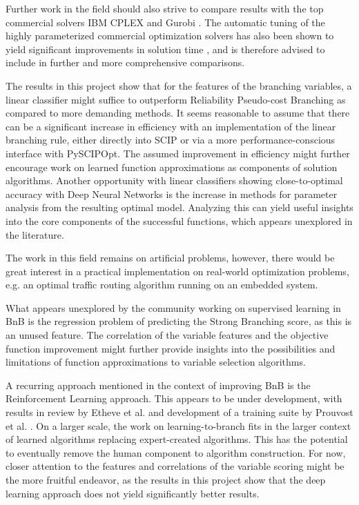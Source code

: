 Further work in the field should also strive to compare results with the top commercial solvers IBM CPLEX and Gurobi \cite{anand2017comparative}. The automatic tuning of the highly parameterized commercial optimization solvers has also been shown to yield significant improvements in solution time \cite{hutter2010automated}, and is therefore advised to include in further and more comprehensive comparisons.  

The results in this project show that for the features of the branching variables, a linear classifier might suffice to outperform Reliability Pseudo-cost Branching as compared to more demanding methods. It seems reasonable to assume that there can be a significant increase in efficiency with an implementation of the linear branching rule, either directly into \gls{SCIP} or via a more performance-conscious interface with PySCIPOpt. The assumed improvement in efficiency might further encourage work on learned function approximations as components of solution algorithms. Another opportunity with linear classifiers showing close-to-optimal accuracy with Deep Neural Networks is the increase in methods for parameter analysis from the resulting optimal model. Analyzing this can yield useful insights into the core components of the successful functions, which appears unexplored in the literature.

The work in this field remains on artificial problems, however, there would be great interest in a practical implementation on real-world optimization problems, e.g. an optimal traffic routing algorithm running on an embedded system. 

What appears unexplored by the community working on supervised learning in \gls{BnB} is the regression problem of predicting the Strong Branching score, as this is an unused feature. The correlation of the variable features and the objective function improvement might further provide insights into the possibilities and limitations of function approximations to variable selection algorithms. 

A recurring approach mentioned in the context of improving \gls{BnB} is the Reinforcement Learning approach. This appears to be under development, with results in review by Etheve et al. \cite{etheve2020reinforcement} and development of a training suite by Prouvost et al. \cite{prouvost2020ecole}. On a larger scale, the work on learning-to-branch fits in the larger context of learned algorithms replacing expert-created algorithms. This has the potential to eventually remove the human component to algorithm construction. For now, closer attention to the features and correlations of the variable scoring might be the more fruitful endeavor, as the results in this project show that the deep learning approach does not yield significantly better results. 


